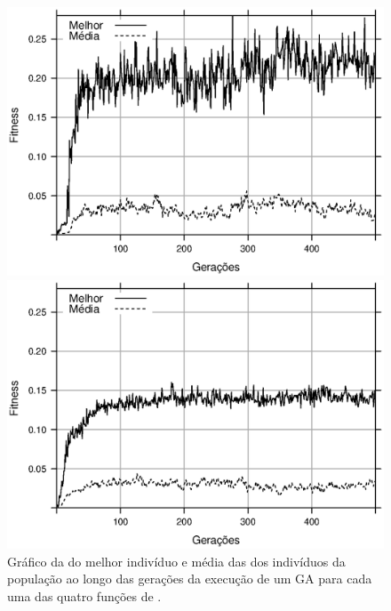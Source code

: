\begin{figure}[h]
    \begin{minipage}{.5\textwidth}
        \includegraphics[width=\textwidth]{figures/fitness-f3}
    \end{minipage}%
    \begin{minipage}{.5\textwidth}
        \includegraphics[width=\textwidth]{figures/fitness-f4}
    \end{minipage}

    \caption{Gráfico da \fitness do melhor indivíduo e média das \fitnessp dos indivíduos da população ao longo das gerações da execução de um GA para cada uma das quatro funções de \fitness.}
    \label{fig:func-fitness-gen}
\end{figure}

